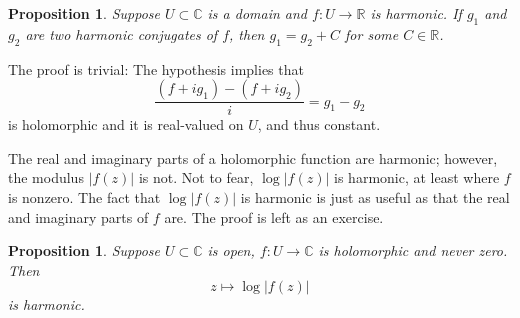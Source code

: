 \documentclass[12pt,openany]{book}
\newcommand{\sabs}[1]{\lvert {#1} \rvert}
\newcommand{\C}{{\mathbb{C}}}
\newcommand{\R}{{\mathbb{R}}}
\theoremstyle{plain}
\newtheorem{prop}[thm]{Proposition}
\theoremstyle{remark}
\theoremstyle{definition}
\theoremstyle{exercise}
\theoremstyle{example}
\begin{document}
\begin{prop} \label{prop:harmonicconjdifferbyconst}
Suppose
$U \subset \C$ is a domain and $f \colon U \to \R$ is harmonic.
If $g_1$ and $g_2$ are two harmonic conjugates of $f$,
then $g_1 = g_2 + C$ for some $C \in \R$.
\end{prop}

The proof is trivial: The hypothesis implies that
\begin{equation*}
\frac{(f + i g_1) - (f + i g_2)}{i} =  g_1-g_2
\end{equation*}
is holomorphic and it is real-valued on $U$, and thus constant.

The real and imaginary parts of a holomorphic function are harmonic;
however, the modulus $\sabs{f(z)}$ is not.  Not to fear,
$\log \sabs{f(z)}$ is harmonic, at least where $f$ is nonzero.
The fact that $\log \sabs{f(z)}$ is harmonic is just as useful
as that the real and imaginary parts of $f$ are.  The proof is left
as an exercise.

\begin{prop} \label{prop:logharm}
Suppose $U \subset \C$ is open, $f \colon U \to \C$ is holomorphic
and never zero.  Then
\begin{equation*}
z \mapsto \log \sabs{f(z)}
\end{equation*}
is harmonic.
\end{prop}
\end{document}
